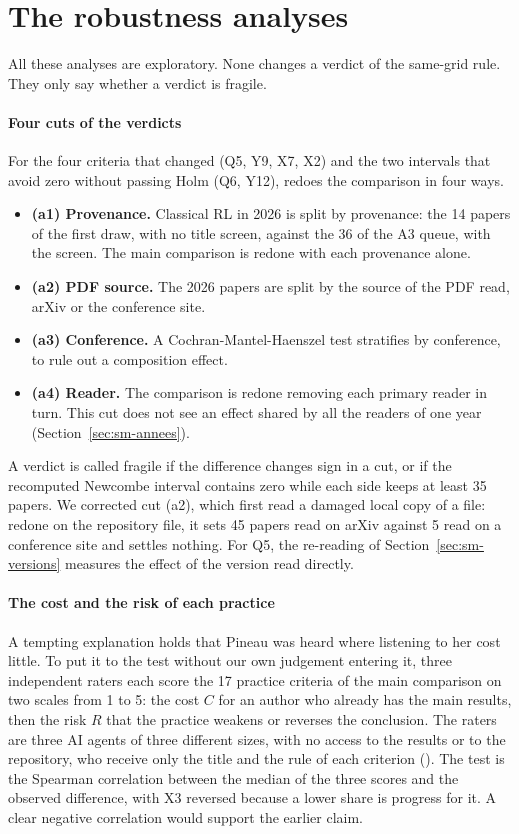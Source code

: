 \section{The robustness analyses}\label{sec:sm-robustesse}

All these analyses are exploratory. None changes a verdict of the same-grid rule. They only say whether a
verdict is fragile.

\paragraph{Four cuts of the verdicts}
For the four criteria that changed (Q5, Y9, X7, X2) and the two intervals that avoid zero without
passing Holm (Q6, Y12),  redoes the comparison in four ways.
\begin{itemize}
  \item \textbf{(a1) Provenance.} Classical RL in 2026 is split by provenance: the 14 papers of the
  first draw, with no title screen, against the 36 of the A3 queue, with the screen. The main
  comparison is redone with each provenance alone.
  \item \textbf{(a2) PDF source.} The 2026 papers are split by the source of the PDF read, arXiv or the
  conference site.
  \item \textbf{(a3) Conference.} A Cochran-Mantel-Haenszel test stratifies by conference, to rule out
  a composition effect.
  \item \textbf{(a4) Reader.} The comparison is redone removing each primary reader in turn. This cut
  does not see an effect shared by all the readers of one year (Section~\ref{sec:sm-annees}).
\end{itemize}
A verdict is called fragile if the difference changes sign in a cut, or if the recomputed Newcombe interval
contains zero while each side keeps at least 35 papers. We corrected cut (a2), which first read a
damaged local copy of a file: redone on the repository file, it sets 45 papers read on arXiv against 5
read on a conference site and settles nothing. For Q5, the re-reading of Section~\ref{sec:sm-versions}
measures the effect of the version read directly.

\paragraph{The cost and the risk of each practice}
A tempting explanation holds that Pineau was heard where listening to her cost little. To put it to
the test without our own judgement entering it, three independent
raters each score the 17 practice criteria of the main comparison on two scales from 1 to 5: the cost
$C$ for an author who already has the main results, then the risk $R$ that the practice weakens or
reverses the conclusion. The raters are three AI agents of three different sizes, with no
access to the results or to the repository, who receive only the title and the rule of each criterion
(). The test is the Spearman correlation between the median of the three scores
and the observed difference, with X3 reversed because a lower share is progress for it. A clear negative
correlation would support the earlier claim.

